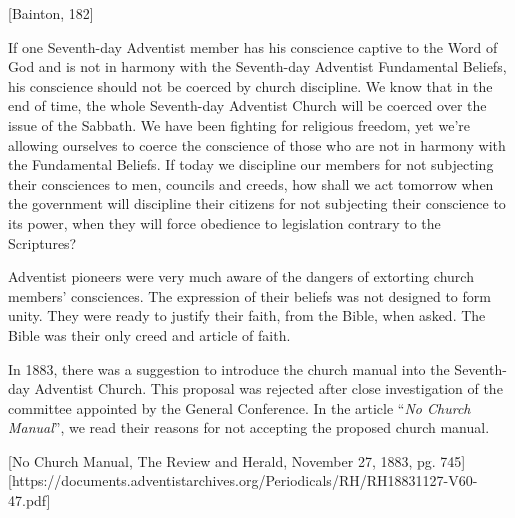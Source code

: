 [Bainton, 182]

If one Seventh-day Adventist member has his conscience captive to the Word of God and is not in harmony with the Seventh-day Adventist Fundamental Beliefs, his conscience should not be coerced by church discipline. We know that in the end of time, the whole Seventh-day Adventist Church will be coerced over the issue of the Sabbath. We have been fighting for religious freedom, yet we’re allowing ourselves to coerce the conscience of those who are not in harmony with the Fundamental Beliefs. If today we discipline our members for not subjecting their consciences to men, councils and creeds, how shall we act tomorrow when the government will discipline their citizens for not subjecting their conscience to its power, when they will force obedience to legislation contrary to the Scriptures?

Adventist pioneers were very much aware of the dangers of extorting church members’ consciences. The expression of their beliefs was not designed to form unity. They were ready to justify their faith, from the Bible, when asked. The Bible was their only creed and article of faith.

In 1883, there was a suggestion to introduce the church manual into the Seventh-day Adventist Church. This proposal was rejected after close investigation of the committee appointed by the General Conference. In the article “\textit{No Church Manual}”, we read their reasons for not accepting the proposed church manual.

[No Church Manual, The Review and Herald, November 27, 1883, pg. 745][https://documents.adventistarchives.org/Periodicals/RH/RH18831127-V60-47.pdf]

